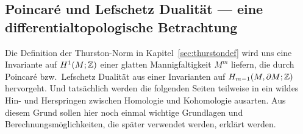 \subsection{Poincaré und Lefschetz Dualität --- eine differentialtopologische Betrachtung}
\label{sec:poinc}

	Die Definition der Thurston-Norm in Kapitel~\ref{sec:thurstondef} wird uns eine Invariante auf $H^1(M;\mathbb{Z})$ einer glatten Mannigfaltigkeit $M^m$ liefern, die durch Poincaré bzw.\ Lefschetz Dualität aus einer Invarianten auf $H_{m-1}(M,\partial M;\mathbb{Z})$ hervorgeht. Und tatsächlich werden die folgenden Seiten teilweise in ein wildes Hin- und Herspringen zwischen Homologie und Kohomologie ausarten. Aus diesem Grund sollen hier noch einmal wichtige Grundlagen und Berechnungsmöglichkeiten, die später verwendet werden, erklärt werden.


